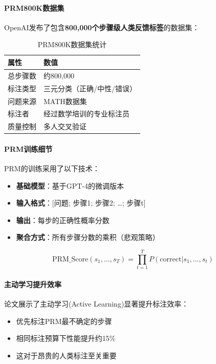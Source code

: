 \documentclass[12pt,a4paper]{article}
\begin{document}
\paragraph{PRM800K数据集}

OpenAI发布了包含\textbf{800,000个步骤级人类反馈标签}的数据集：

\begin{table}[H]
\centering
\caption{PRM800K数据集统计}
\begin{tabular}{ll}
\toprule
\textbf{属性} & \textbf{数值} \\
\midrule
总步骤数 & 约800,000 \\
标注类型 & 三元分类（正确/中性/错误） \\
问题来源 & MATH数据集 \\
标注者 & 经过数学培训的专业标注员 \\
质量控制 & 多人交叉验证 \\
\bottomrule
\end{tabular}
\end{table}

\paragraph{PRM训练细节}

PRM的训练采用了以下技术：

\begin{itemize}
    \item \textbf{基础模型}：基于GPT-4的微调版本
    \item \textbf{输入格式}：[问题; 步骤1; 步骤2; \ldots; 步骤t]
    \item \textbf{输出}：每步的正确性概率分数
    \item \textbf{聚合方式}：所有步骤分数的乘积（悲观策略）
\end{itemize}

\begin{equation}
\text{PRM\_Score}(s_1, \ldots, s_T) = \prod_{t=1}^{T} P(\text{correct}|s_1, \ldots, s_t)
\end{equation}

\paragraph{主动学习提升效率}

论文展示了主动学习(Active Learning)显著提升标注效率：

\begin{itemize}
    \item 优先标注PRM最不确定的步骤
    \item 相同标注预算下性能提升约15\%
    \item 这对于昂贵的人类标注至关重要
\end{itemize}
\end{document}
